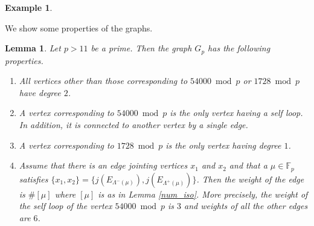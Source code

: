 \documentclass[a4paper, 11pt]{article}
\newtheorem{exam}[defn]{Example}
\theoremstyle{plain}
\newtheorem{lem}[defn]{Lemma}
\newcommand{\?}{\textcolor{red}{??}}
\newcommand{\Lm}{\Lambda}
\newcommand{\fp}{\mathbb{F}_p}
\begin{document}
\begin{exam}
\hspace{0pt}

\end{exam}
We show some properties of the graphs. 
\begin{lem}\label{propertiesofgraph}
Let $p>11$ be a prime. Then the graph $G_p$ has the following properties. 
    \begin{enumerate}
    
    \item [\rm{(a)}] All vertices other than those corresponding to $54000 \bmod p $ or $1728 \bmod p $ have degree $2$. 
        \item[\rm{(b)}] A vertex corresponding to $54000 \bmod p $ is the only vertex having a self loop. In addition, it is connected to another vertex by a single edge.
        \item [\rm{(c)}] A vertex corresponding to $1728 \bmod p $ is the only vertex having degree $1$. %
           \item [\rm{(d)}] 
           
           Assume that there is an edge jointing vertices $x_1$ and $x_2$ and that a $\mu \in\fp$ satisfies $\{x_1,x_2\}=\{j(E_{\Lm^{-}(\mu)}),j(E_{\Lm^{+}(\mu)})\}$. Then the weight of the edge is $\#[\mu]$ where $[\mu]$ is as in Lemma \ref{num_iso}. More precisely, the weight of the self loop of the vertex $54000 \bmod p$ is $3$ and weights of all the other edges are $6$.
        
    \end{enumerate}
\end{lem}
\end{document}
